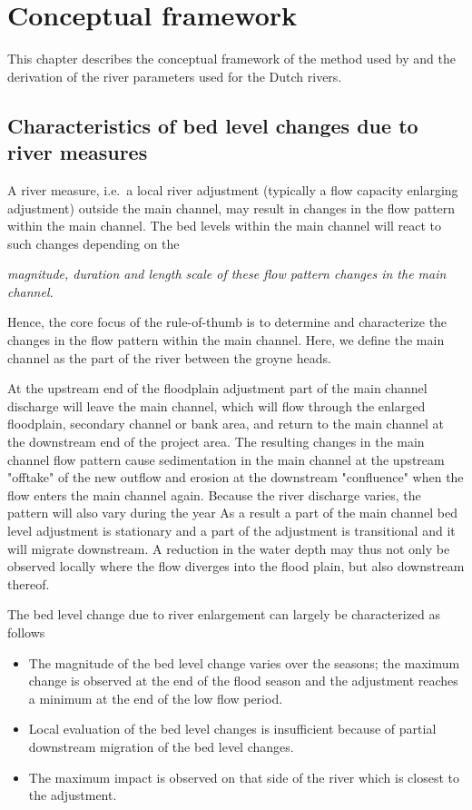 \chapter{Conceptual framework}

This chapter describes the conceptual framework of the method used by \dfastmi and the derivation of the river parameters used for the Dutch rivers.

\section{Characteristics of bed level changes due to river measures}

A river measure, i.e.~a local river adjustment (typically a flow capacity enlarging adjustment) outside the main channel, may result in changes in the flow pattern within the main channel.
The bed levels within the main channel will react to such changes depending on the

\hspace{1cm}\emph{magnitude, duration and length scale of these flow pattern changes in the main channel.}

Hence, the core focus of the rule-of-thumb is to determine and characterize the changes in the flow pattern within the main channel.
Here, we define the main channel as the part of the river between the groyne heads.

At the upstream end of the floodplain adjustment part of the main channel discharge will leave the main channel, which will flow through the enlarged floodplain, secondary channel or bank area, and return to the main channel at the downstream end of the project area.
The resulting changes in the main channel flow pattern cause sedimentation in the main channel at the upstream "offtake" of the new outflow and erosion at the downstream "confluence" when the flow enters the main channel again.
Because the river discharge varies, the pattern will also vary during the year
As a result a part of the main channel bed level adjustment is stationary and a part of the adjustment is transitional and it will migrate downstream.
A reduction in the water depth may thus not only be observed locally where the flow diverges into the flood plain, but also downstream thereof.

The bed level change due to river enlargement can largely be characterized as follows

\begin{itemize}
\item The magnitude of the bed level change varies over the seasons; the maximum change is observed at the end of the flood season and the adjustment reaches a minimum at the end of the low flow period.

\item Local evaluation of the bed level changes is insufficient because of partial downstream migration of the bed level changes.

\item The maximum impact is observed on that side of the river which is closest to the adjustment.
\end{itemize}

